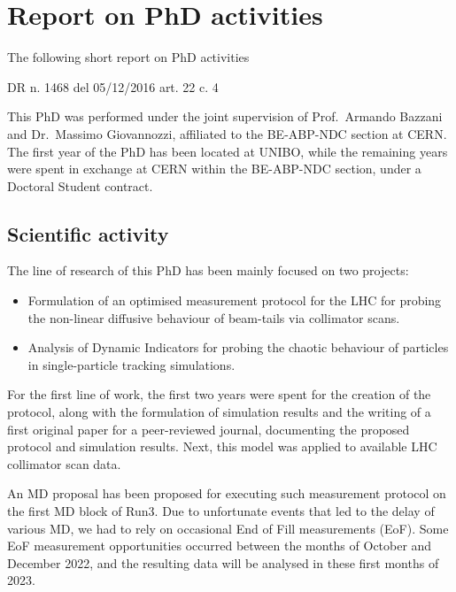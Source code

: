 \chapter*{Report on PhD activities}
\sectionmark{}

\noindent\textsf{The following short report on PhD activities}

\vspace{3em}

DR n. 1468 del 05/12/2016 art. 22 c. 4

This PhD was performed under the joint supervision of Prof.~Armando Bazzani and Dr.~Massimo Giovannozzi, affiliated to the BE-ABP-NDC section at CERN. The first year of the PhD has been located at UNIBO, while the remaining years were spent in exchange at CERN within the BE-ABP-NDC section, under a Doctoral Student contract.

\section*{Scientific activity}

The line of research of this PhD has been mainly focused on two projects:
\begin{itemize}
    \item Formulation of an optimised measurement protocol for the LHC for
probing the non-linear diffusive behaviour of beam-tails via collimator
scans.
    \item Analysis of Dynamic Indicators for probing the chaotic behaviour of particles
in single-particle tracking simulations.
\end{itemize}

For the first line of work, the first two years were spent for the creation of the protocol, along with the formulation of simulation results and the writing of a first original paper for a peer-reviewed journal, documenting the proposed protocol and simulation results. Next, this
model was applied to available LHC collimator scan data.

An MD proposal has been proposed for executing such measurement
protocol on the first MD block of Run3. Due to unfortunate events that led to
the delay of various MD, we had to rely on occasional End of Fill
measurements (EoF). Some EoF measurement opportunities occurred between the months of October and December 2022, and the resulting data will be analysed in these first months of 2023.

